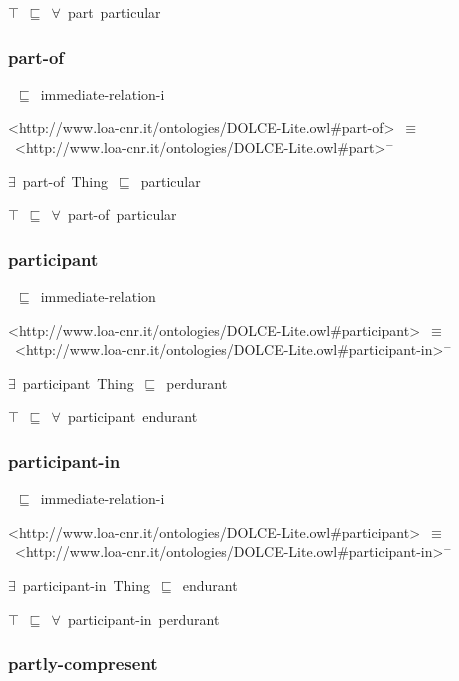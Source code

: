 \documentclass{article}
\begin{document}
\ensuremath{\top}~\ensuremath{\sqsubseteq}~\ensuremath{\forall}~part~particular

\subsubsection*{part-of}

~\ensuremath{\sqsubseteq}~immediate-relation-i

<http://www.loa-cnr.it/ontologies/DOLCE-Lite.owl#part-of>~\ensuremath{\equiv}~<http://www.loa-cnr.it/ontologies/DOLCE-Lite.owl#part>\ensuremath{^-}



\ensuremath{\exists}~part-of~Thing~\ensuremath{\sqsubseteq}~particular

\ensuremath{\top}~\ensuremath{\sqsubseteq}~\ensuremath{\forall}~part-of~particular

\subsubsection*{participant}

~\ensuremath{\sqsubseteq}~immediate-relation

<http://www.loa-cnr.it/ontologies/DOLCE-Lite.owl#participant>~\ensuremath{\equiv}~<http://www.loa-cnr.it/ontologies/DOLCE-Lite.owl#participant-in>\ensuremath{^-}

\ensuremath{\exists}~participant~Thing~\ensuremath{\sqsubseteq}~perdurant

\ensuremath{\top}~\ensuremath{\sqsubseteq}~\ensuremath{\forall}~participant~endurant

\subsubsection*{participant-in}

~\ensuremath{\sqsubseteq}~immediate-relation-i

<http://www.loa-cnr.it/ontologies/DOLCE-Lite.owl#participant>~\ensuremath{\equiv}~<http://www.loa-cnr.it/ontologies/DOLCE-Lite.owl#participant-in>\ensuremath{^-}

\ensuremath{\exists}~participant-in~Thing~\ensuremath{\sqsubseteq}~endurant

\ensuremath{\top}~\ensuremath{\sqsubseteq}~\ensuremath{\forall}~participant-in~perdurant

\subsubsection*{partly-compresent}
\end{document}
